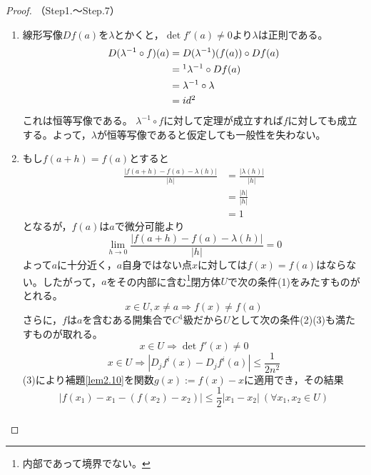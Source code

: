 \begin{proof}（Step1.〜Step.7）
	\begin{enumerate}\renewcommand{\labelenumi}{Step\arabic{enumi}.}
	\item 線形写像$Df(a)$を$\lambda$とかくと，$\det f'(a)\neq0$より$\lambda$は正則である。
	\[
	\begin{split}
	D(\lambda^{-1}\circ f)(a)
	&=D(\lambda^{-1})(f(a))\circ Df(a) \\
	&=\footnotemark\lambda^{-1}\circ Df(a) \\
	&=\lambda^{-1}\circ\lambda \\
	&=id\footnotemark
	\end{split}
	\]
	これは恒等写像である。
	$\lambda^{-1}\circ f$に対して定理が成立すれば$f$に対しても成立する。よって，$\lambda$が恒等写像であると仮定しても一般性を失わない。
	\item もし$f(a+h)=f(a)$とすると
	\[
	\begin{split}
	\frac{|f(a+h)-f(a)-\lambda(h)|}{|h|}&=\frac{|\lambda(h)|}{|h|}\\
	&=\frac{|h|}{|h|}\\
	&=1
	\end{split}
	\]
	となるが，$f(a)$は$a$で微分可能より
	\[
	\lim_{h\to0}\frac{|f(a+h)-f(a)-\lambda(h)|}{|h|}=0
	\]
	よって$a$に十分近く，$a$自身ではない点$x$に対しては$f(x)=f(a)$はならない。したがって，$a$をその内部に含む\footnote{内部であって境界でない。}閉方体$U$で次の条件(1)をみたすものがとれる。　
	\setcounter{equation}{0}
	\begin{equation}
		x\in U,x\neq a\Rightarrow f(x)\neq f(a)
	\end{equation}
	さらに，$f$は$a$を含むある開集合で$C^1$級だから$U$として次の条件(2)(3)も満たすものが取れる。
	\begin{equation}
		x\in U\Rightarrow \det f'(x)\neq0
	\end{equation}
	\begin{equation}
	x\in U\Rightarrow|D_jf^i(x)-D_jf^i(a)|\leq\frac{1}{2n^2}
	\end{equation}
	(3)により補題\ref{lem2.10}を関数$g(x):=f(x)-x$に適用でき，その結果
	\[
	|f(x_1)-x_1-(f(x_2)-x_2)|\leq\frac{1}{2}|x_1-x_2|\ (\forall x_1,x_2\in U)
	\] \footnotemark
	\[
	\begin{split}

\end{split}\]
\end{enumerate}
\end{proof}
